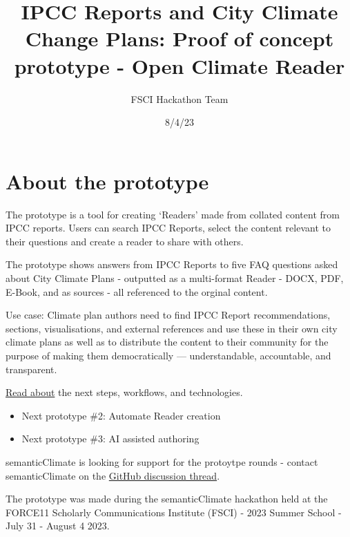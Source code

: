 \documentclass[
  letterpaper,
  DIV=11,
  numbers=noendperiod]{scrreprt}
\title{IPCC Reports and City Climate Change Plans: Proof of concept
prototype - Open Climate Reader}
\author{FSCI Hackathon Team}
\date{8/4/23}
\providecommand{\tightlist}{%
  \setlength{\itemsep}{0pt}\setlength{\parskip}{0pt}}\usepackage{longtable,booktabs,array}
\renewcommand*\contentsname{Table of contents}
\newcommand\contentsname{Table of contents}
\begin{document}
\maketitle
\ifdefined\Shaded\renewenvironment{Shaded}{\begin{tcolorbox}[interior hidden, borderline west={3pt}{0pt}{shadecolor}, boxrule=0pt, breakable, enhanced, sharp corners, frame hidden]}{\end{tcolorbox}}\fi

\renewcommand*\contentsname{Table of contents}
{
\hypersetup{linkcolor=}
\setcounter{tocdepth}{2}
\tableofcontents
}

\hypertarget{about-the-prototype}{%
\chapter{About the prototype}\label{about-the-prototype}}

The prototype is a tool for creating `Readers' made from collated
content from IPCC reports. Users can search IPCC Reports, select the
content relevant to their questions and create a reader to share with
others.

The prototype shows answers from IPCC Reports to five FAQ questions
asked about City Climate Plans - outputted as a multi-format Reader -
DOCX, PDF, E-Book, and as sources - all referenced to the orginal
content.

Use case: Climate plan authors need to find IPCC Report recommendations,
sections, visualisations, and external references and use these in their
own city climate plans as well as to distribute the content to their
community for the purpose of making them democratically ---
understandable, accountable, and transparent.

\href{workflow.html}{Read about} the next steps, workflows, and
technologies.

\begin{itemize}
\tightlist
\item
  Next prototype \#2: Automate Reader creation
\item
  Next prototype \#3: AI assisted authoring
\end{itemize}

semanticClimate is looking for support for the protoytpe rounds -
contact semanticClimate on the
\href{https://github.com/petermr/semanticClimate/discussions/32}{GitHub
discussion thread}.

The prototype was made during the semanticClimate hackathon held at the
FORCE11 Scholarly Communications Institute (FSCI) - 2023 Summer School -
July 31 - August 4 2023.
\end{document}
